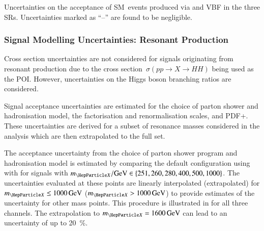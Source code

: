 \begin{table}[htbp]
  \centering

  \caption[Unceratinties on the acceptance of SM~\HH events in the
  SRs.]{Uncertainties on the acceptance of SM~\HH events produced via \ggF and
    VBF in the three SRs. Uncertainties marked as ``--'' are found to be
    negligible.}%
  \label{tab:theory_uncertainty_signal}

  
\end{table}


\subsubsection{Signal Modelling Uncertainties: Resonant \HH Production}

Cross section uncertainties are not considered for signals originating from
resonant \HH production due to the cross section~$\sigma(pp \to X \to HH)$ being
used as the POI. However, uncertainties on the Higgs boson branching ratios are
considered.

Signal acceptance uncertainties are estimated for the choice of parton shower
and hadronisation model, the factorisation and renormalisation scales, and
PDF+\alphas. These uncertainties are derived for a subset of resonance masses
considered in the analysis
which are then extrapolated to the full set.

The acceptance uncertainty from the choice of parton shower program and
hadronisation model is estimated by comparing the default configuration using
\HERWIG[7] with \PYTHIA[8] for signals with
\mbox{$\mX / \si{\GeV} \in \left\{ 251, 260, 280, 400, 500, 1000 \right\}$}.
The uncertainties evaluated at these points are linearly interpolated
(extrapolated) for $\mX \leq \SI{1000}{\GeV}$ ($\mX > \SI{1000}{\GeV}$) to
provide estimates of the uncertainty for other mass points. This procedure is
illustrated in  for all three channels. The
extrapolation to $\mX = \SI{1600}{\GeV}$ can lead to an uncertainty of up to
\SI{20}{\percent}.

